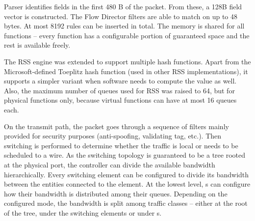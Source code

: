 Parser identifies fields in the first 480 B of the packet. From these, a 128B
field vector is constructed. The Flow Director filters are able to match on up
to 48 bytes. At most 8192 rules can be inserted in total. The memory is shared
for all functions -- every function has a configurable portion of guaranteed
space and the rest is available freely.

The RSS engine was extended to support multiple hash functions. Apart from the
Microsoft-defined Toeplitz hash function (used in other RSS implementations),
it supports a simpler variant when software needs to compute the value as well.
Also, the maximum number of queues used for RSS was raised to 64, but
for physical functions only, because virtual functions can have at most 16
queues each.

On the transmit path, the packet goes through a sequence of filters mainly
provided for security purposes (anti-spoofing, validating  tag, etc.).
Then switching is performed to determine whether the traffic is local or
needs to be scheduled to a wire. As the switching topology is guaranteed to be
a tree rooted at the physical port, the controller can divide the available
bandwidth hierarchically. Every switching element can be configured to
divide its bandwidth between the entities connected to the element. At the lowest
level, s can configure how their bandwidth is distributed among their
queues. Depending on the configured mode, the bandwidth is split among traffic
classes -- either at the root of the tree, under the switching elements or
under s.


